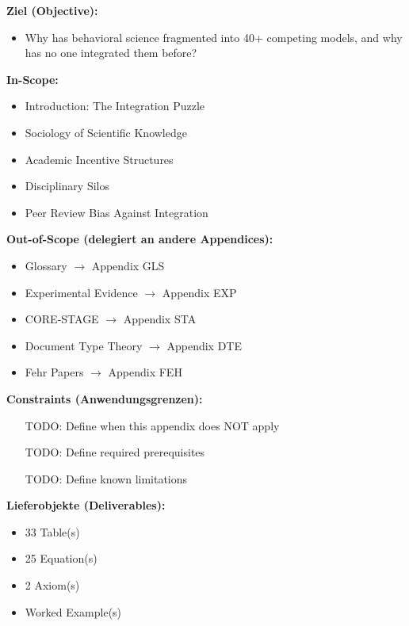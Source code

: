 \begin{tcolorbox}[
    colback=orange!5!white,
    colframe=orange!75!black,
    title={\textbf{Appendix Scope: Ziel / In-Scope / Out-of-Scope / Constraints}},
    fonttitle=\bfseries
]

\textbf{Ziel (Objective):}
\begin{itemize}[nosep]
    \item Why has behavioral science fragmented into 40+ competing models, and why
has no one integrated them before?
\end{itemize}

\textbf{In-Scope:}
\begin{itemize}[nosep]
    \item Introduction: The Integration Puzzle
    \item Sociology of Scientific Knowledge
    \item Academic Incentive Structures
    \item Disciplinary Silos
    \item Peer Review Bias Against Integration
\end{itemize}

\textbf{Out-of-Scope (delegiert an andere Appendices):}
\begin{itemize}[nosep]
    \item Glossary $\rightarrow$ Appendix GLS
    \item Experimental Evidence $\rightarrow$ Appendix EXP
    \item CORE-STAGE $\rightarrow$ Appendix STA
    \item Document Type Theory $\rightarrow$ Appendix DTE
    \item Fehr Papers $\rightarrow$ Appendix FEH
\end{itemize}

\textbf{Constraints (Anwendungsgrenzen):}
\begin{itemize}[nosep]
    \item [TODO: Define when this appendix does NOT apply]
    \item [TODO: Define required prerequisites]
    \item [TODO: Define known limitations]
\end{itemize}

\textbf{Lieferobjekte (Deliverables):}
\begin{itemize}[nosep]
    \item 33 Table(s)
    \item 25 Equation(s)
    \item 2 Axiom(s)
    \item Worked Example(s)
\end{itemize}

\end{tcolorbox}


